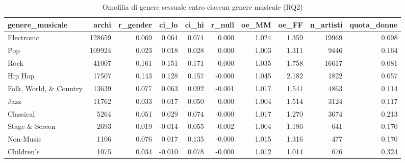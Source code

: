 \begin{table}
\centering
\caption{Omofilia di genere sessuale entro ciascun genere musicale (RQ2)}
\label{tab:t3_omofilia_per_genere_musicale}
\begin{tabular}{lrrrrrrrrr}
\toprule
       genere\_musicale &  archi &  r\_gender &  ci\_lo &  ci\_hi &  r\_null &  oe\_MM &  oe\_FF &  n\_artisti &  quota\_donne \\
\midrule
            Electronic & 128659 &     0.069 &  0.064 &  0.074 &   0.000 &  1.024 &  1.359 &      19969 &        0.098 \\
                   Pop & 109924 &     0.023 &  0.018 &  0.028 &   0.000 &  1.003 &  1.311 &       9446 &        0.164 \\
                  Rock &  41007 &     0.161 &  0.151 &  0.171 &   0.000 &  1.035 &  1.758 &      16617 &        0.081 \\
               Hip Hop &  17507 &     0.143 &  0.128 &  0.157 &  -0.000 &  1.045 &  2.182 &       1822 &        0.057 \\
Folk, World, \& Country &  13639 &     0.077 &  0.063 &  0.092 &  -0.001 &  1.017 &  1.541 &       4863 &        0.114 \\
                  Jazz &  11762 &     0.033 &  0.017 &  0.050 &   0.000 &  1.004 &  1.514 &       3124 &        0.117 \\
             Classical &   5264 &     0.051 &  0.029 &  0.074 &  -0.000 &  1.017 &  1.270 &       3674 &        0.213 \\
        Stage \& Screen &   2693 &     0.019 & -0.014 &  0.055 &  -0.002 &  1.004 &  1.186 &        641 &        0.170 \\
             Non-Music &   1106 &     0.076 &  0.017 &  0.135 &  -0.000 &  1.015 &  1.316 &        477 &        0.170 \\
            Children's &   1075 &     0.034 & -0.010 &  0.078 &  -0.000 &  1.012 &  1.014 &        676 &        0.324 \\
\bottomrule
\end{tabular}
\end{table}
